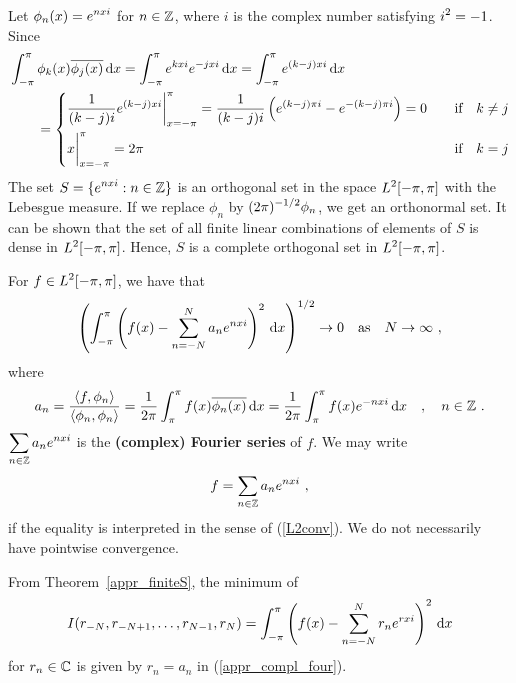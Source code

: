 \begin{egg}
Let $\displaystyle \phi_n(x) = e^{n x i}$ for $n \in \mathbb{Z}$, where $i$
is the complex number satisfying $\displaystyle i^2=-1$.  Since
\begin{align*}
&\int_{-\pi}^\pi \phi_k(x) \overline{\phi_j(x)} \,\mathrm{d}x
= \int_{-\pi}^\pi e^{kx i} e^{-jx i} \,\mathrm{d}x
= \int_{-\pi}^\pi e^{(k-j)x i} \,\mathrm{d}x \\
& \qquad =
\begin{cases}
\displaystyle \frac{1}{(k-j)i} e^{(k-j)x i}\bigg|_{x=-\pi}^{\pi} =
\frac{1}{(k-j)i} \left( e^{(k-j)\pi i} - e^{-(k-j)\pi i}\right) = 0 &
\quad \text{if} \quad k \neq j \\[1em]
\displaystyle x\bigg|_{x=-\pi}^{\pi} = 2\pi & \quad \text{if} \quad k = j
\end{cases}
\end{align*}
The set $\displaystyle S = \{ e^{n x i} : n\in \mathbb{Z}\}$ is an orthogonal
set in the space $\displaystyle L^2[-\pi,\pi]$ with the Lebesgue measure.  If we
replace $\phi_n$ by $\displaystyle (2\pi)^{-1/2} \phi_n$, we get an
orthonormal set.  It can be shown that the set of all finite linear combinations
of elements of $S$ is dense in $\displaystyle L^2[-\pi,\pi]$.  Hence, $S$ is a
complete orthogonal set in $\displaystyle L^2[-\pi,\pi]$.

For $\displaystyle f\in L^2[-\pi,\pi]$, we have that
\begin{equation}\label{L2conv}
\left( \int_{-\pi}^\pi \left( f(x) - \sum_{n=-N}^{N} a_n e^{nx i} \right)^2
\,\mathrm{d}x \right)^{1/2} \rightarrow 0 \quad \text{as} \quad
N \rightarrow \infty \ ,
\end{equation}
where
\begin{equation} \label{appr_compl_four}
a_n = \frac{\left\langle{f} , {\phi_n}\right\rangle}{\left\langle{\phi_n} , {\phi_n}\right\rangle}
= \frac{1}{2\pi} \int_{\pi}^\pi f(x)\overline{\phi_n(x)} \,\mathrm{d}x
= \frac{1}{2\pi} \int_{\pi}^\pi f(x) e^{-nx i} \,\mathrm{d}x
\quad , \quad n \in \mathbb{Z} \ .
\end{equation}
$\displaystyle \sum_{n\in \mathbb{Z}} a_n e^{nx i}$
is the
{\bfseries (complex) Fourier series} of $f$.  We may write
\[
f = \sum_{n\in \mathbb{Z}} a_n e^{nx i} \ ,
\]
if the equality is interpreted in the sense of (\ref{L2conv}).  We do
not necessarily have pointwise convergence.

From Theorem~\ref{appr_finiteS}, the minimum of
\[
I(r_{-N}, r_{-N+1}, \ldots , r_{N-1}, r_N)
= \int_{-\pi}^\pi \left( f(x) - \sum_{n=-N}^{N} r_n e^{rx i} \right)^2 \,\mathrm{d}x
\]
for $r_n \in \mathbb{C}$ is given by $r_n = a_n$ in (\ref{appr_compl_four}).
\label{appr_egg_complex_poly}
\end{egg}

